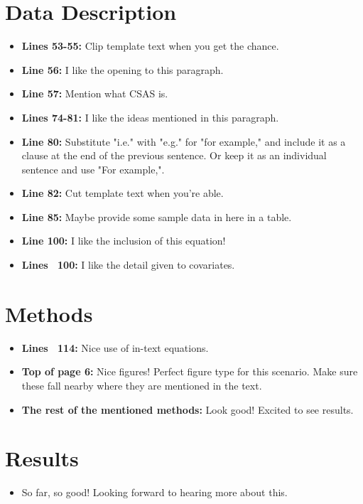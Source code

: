 \documentclass[12pt]{article}
\begin{document}
\section*{Data Description}

\begin{itemize}
    \item \textbf{Lines 53-55:} Clip template text when you get the chance.
    \item \textbf{Line 56:} I like the opening to this paragraph.
    \item \textbf{Line 57:} Mention what CSAS is.
    \item \textbf{Lines 74-81:} I like the ideas mentioned in this paragraph.
    \item \textbf{Line 80:} Substitute "i.e." with "e.g." for "for example," and include it as a clause at the end of the previous sentence. Or keep it as an individual sentence and use "For example,".
    \item \textbf{Line 82:} Cut template text when you're able.
    \item \textbf{Line 85:} Maybe provide some sample data in here in a table.
    \item \textbf{Line 100:} I like the inclusion of this equation!
    \item \textbf{Lines ~100:} I like the detail given to covariates.
\end{itemize}

\section*{Methods}

\begin{itemize}
    \item \textbf{Lines ~114:} Nice use of in-text equations.
    \item \textbf{Top of page 6:} Nice figures! Perfect figure type for this scenario. Make sure these fall nearby where they are mentioned in the text.
    \item \textbf{The rest of the mentioned methods:} Look good! Excited to see results.
\end{itemize}

\section*{Results}

\begin{itemize}
    \item So far, so good! Looking forward to hearing more about this.
\end{itemize}
\end{document}
